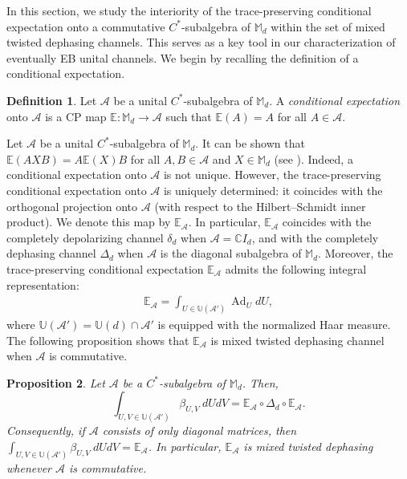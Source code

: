 \documentclass[11pt,reqno]{amsart}
\theoremstyle{definition}
\newtheorem{defn}{Definition}[section]
\theoremstyle{plain}
\newtheorem{prop}[defn]{Proposition}
\theoremstyle{remark}
\numberwithin{equation}{section}%
\begin{document}
In this section, we study the interiority of the trace-preserving conditional expectation onto a commutative $C^*$-subalgebra of $\mathbb{M}_d$ within the set of mixed twisted dephasing channels. This serves as a key tool in our characterization of eventually EB unital channels. We begin by recalling the definition of a conditional expectation.


  \begin{defn}
	Let $\mathcal{A}$ be a unital $C^*$-subalgebra of $\mathbb{M}_d$. A \textit{conditional expectation} onto $\mathcal{A}$ is a CP map $\mathbb{E}:\mathbb{M}_d\rightarrow\mathcal{A}$ such that $\mathbb{E}(A)=A$ for all $A\in\mathcal{A}$.
 \end{defn}


Let $\mathcal{A}$ be a unital $C^*$-subalgebra of $\mathbb{M}_d$. It can be shown that $\mathbb{E}(AXB)=A\mathbb{E}(X)B$ for all $A,B\in\mathcal{A}$ and $X\in\mathbb{M}_d$ (see \cite{RP, HU}). Indeed, a conditional expectation onto $\mathcal{A}$ is not unique. However, the trace-preserving conditional expectation onto $\mathcal{A}$ is uniquely determined: it coincides with the orthogonal projection onto $\mathcal{A}$ (with respect to the Hilbert--Schmidt inner product). We denote this map by $\mathbb{E}_{\mathcal{A}}$. In particular, $\mathbb{E}_{\mathcal{A}}$ coincides with the completely depolarizing channel $\delta_d$ when $\mathcal{A}=\mathbb{C}I_d$, and with the completely dephasing channel $\Delta_d$ when $\mathcal{A}$ is the diagonal subalgebra of $\mathbb{M}_d$. Moreover, the trace-preserving conditional expectation $\mathbb{E}_{\mathcal{A}}$ admits the following integral representation:
\begin{align}\label{ce}
	\mathbb{E}_{\mathcal{A}}=\int_{U\in\mathbb{U}(\mathcal{A}')}\operatorname{Ad}_U dU,
\end{align}
where ${\mathbb{U}(\mathcal{A}')}=\mathbb{U}(d)\cap\mathcal{A}'$ is equipped with the normalized Haar measure. The following proposition shows that $\mathbb{E}_{\mathcal{A}}$ is mixed twisted dephasing channel when $\mathcal{A}$ is commutative.



  \begin{prop}\label{EMD:prop2}
	Let $\mathcal{A}$ be a $C^*$-subalgebra of $\mathbb{M}_d$. Then, \[\int_{U,V\in \mathbb{U}(\mathcal{A}')}\beta_{U,V}\ dU dV=\mathbb{E}_{\mathcal{A}}\circ\Delta_d\circ \mathbb{E}_{\mathcal{A}}.\]
	Consequently, if $\mathcal{A}$ consists of only diagonal matrices, then $\int_{U,V\in \mathbb{U}(\mathcal{A}')}\beta_{U,V}\ dU dV=\mathbb{E}_{\mathcal{A}}$. In particular, $\mathbb{E}_{\mathcal{A}}$ is mixed twisted dephasing whenever $\mathcal{A}$ is commutative.
\end{prop}
\end{document}
